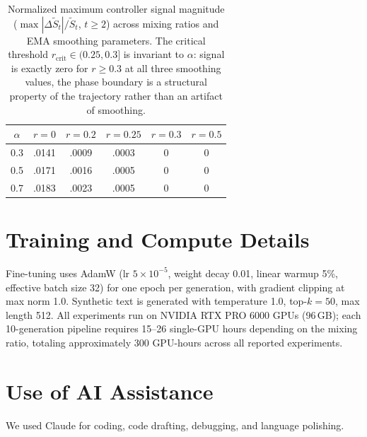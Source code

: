 \begin{table}[H]
\centering
\small
\setlength{\tabcolsep}{5pt}
\begin{tabular}{@{}cccccc@{}}
\toprule
$\alpha$ & $r{=}0$ & $r{=}0.2$ & $r{=}0.25$ & $r{=}0.3$ & $r{=}0.5$ \\
\midrule
0.3 & .0141 & .0009 & .0003 & 0 & 0 \\
0.5 & .0171 & .0016 & .0005 & 0 & 0 \\
0.7 & .0183 & .0023 & .0005 & 0 & 0 \\
\bottomrule
\end{tabular}
\caption{Normalized maximum controller signal magnitude ($\max|\Delta\tilde{S}_t| / \tilde{S}_t$, $t \geq 2$) across mixing ratios and EMA smoothing parameters. The critical threshold $r_{\text{crit}} \in (0.25, 0.3]$ is invariant to $\alpha$: signal is exactly zero for $r \geq 0.3$ at all three smoothing values, the phase boundary is a structural property of the trajectory rather than an artifact of smoothing.}
\label{tab:alpha_robustness}
\end{table}

\section{Training and Compute Details}
\label{app:training_details}

Fine-tuning uses AdamW (lr $5 \times 10^{-5}$, weight decay 0.01, linear warmup 5\%, effective batch size 32) for one epoch per generation, with gradient clipping at max norm 1.0.
Synthetic text is generated with temperature 1.0, top-$k{=}50$, max length 512.
All experiments run on NVIDIA RTX PRO 6000 GPUs (96\,GB); each 10-generation pipeline requires 15--26 single-GPU hours depending on the mixing ratio, totaling approximately 300 GPU-hours across all reported experiments.

\section{Use of AI Assistance}
We used Claude for coding, code drafting, debugging, and language polishing.
